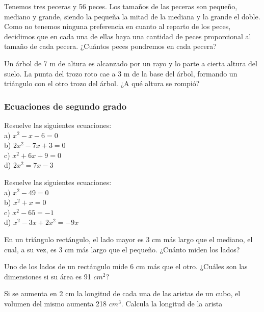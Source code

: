 \begin{ejer}
Tenemos tres peceras y 56 peces. Los tamaños de las peceras son pequeño, mediano y grande, siendo la pequeña la mitad de la mediana y la grande el doble. Como no tenemos ninguna preferencia en cuanto al reparto de los peces, decidimos que en cada una de ellas haya una cantidad de peces proporcional al tamaño de cada pecera. ¿Cuántos peces pondremos en cada pecera?
\end{ejer}

\begin{ejer}
Un árbol de 7 m de altura es alcanzado por un rayo y lo parte a cierta altura del suelo. La punta del trozo roto cae a 3 m de la base del árbol, formando un triángulo con el otro trozo del árbol. ¿A qué altura se rompió?
\end{ejer}


\subsubsection{Ecuaciones de segundo grado}

\begin{ejer}
Resuelve las siguientes ecuaciones: \\
a) $x^2-x-6=0$ \\
b) $2x^2-7x+3=0$ \\
c) $x^2+6x+9=0$ \\
d) $2x^2=7x-3$
\end{ejer}

\begin{ejer}
Resuelve las siguientes ecuaciones: \\
a) $x^2-49 = 0$ \\
b) $x^2+x=0$ \\
c) $x^2-65=-1$ \\
d) $x^2-3x+2x^2=-9x$ \\
\end{ejer}

\begin{ejer}
En un triángulo rectángulo, el lado mayor es 3 cm más largo que el mediano, el cual, a su vez, es 3 cm más largo que el pequeño. ¿Cuánto miden los lados?
\end{ejer}

\begin{ejer}
Uno de los lados de un rectángulo mide 6 cm más que el otro. ¿Cuáles son las dimensiones si su área es 91 $cm^2$?
\end{ejer}

\begin{ejer}
Si se aumenta en 2 cm la longitud de cada una de las aristas de un cubo, el volumen del mismo aumenta 218 $cm^3$. Calcula la longitud de la arista
\end{ejer}

